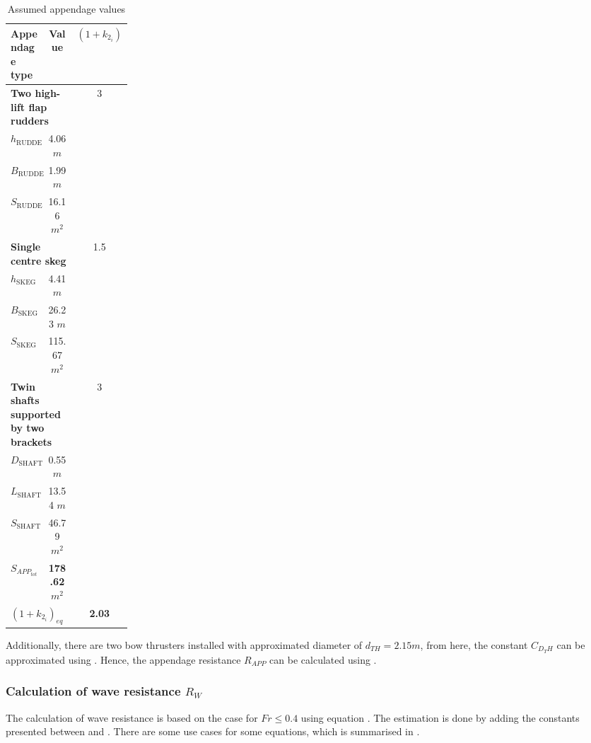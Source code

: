 \begin{table}[h]
    \footnotesize
    \centering
    {\begin{tabular}{ p{0.2\linewidth} c c}
    \hline
    Appendage type & Value & $(1+k_{2_i})$ \\
    \hline
    \multicolumn{2}{l}{\textbf{Two high-lift flap rudders}} & 3\\
    \hline
    $h_{\text{RUDDER}}$ & 4.06 $m$\\
    $B_{\text{RUDDER}}$ & 1.99 $m$\\
    $S_{\text{RUDDER}}$ & 16.16 $m^2$\\
    \hline
    \multicolumn{2}{l}{\textbf{Single centre skeg}} & 1.5\\
    \hline
    $h_{\text{SKEG}}$ & 4.41 $m$\\
    $B_{\text{SKEG}}$ & 26.23 $m$\\
    $S_{\text{SKEG}}$ & 115.67 $m^2$\\
    \hline
    \multicolumn{2}{l}{\textbf{Twin shafts supported by two brackets}} & 3\\
    \hline
    $D_{\text{SHAFT}}$ & 0.55 $m$\\
    $L_{\text{SHAFT}}$ & 13.54 $m$\\
    $S_{\text{SHAFT}}$ & 46.79 $m^2$\\
    \hline
    \multicolumn{1}{l}{\textbf{$S_{APP_{tot}}$}} & \textbf{178.62} $m^2$ \\
    \multicolumn{2}{l}{\textbf{$(1+k_{2_i})_{eq}$}} & \textbf{2.03} \\
    \end{tabular}}
\caption{Assumed appendage values}\label{tbl:assume_appendage_dimension}
\end{table}

Additionally, there are two bow thrusters installed with approximated diameter of $d_{TH}= 2.15 m$, from here, the constant $C_{D_TH}$ can be approximated using . Hence, the appendage resistance $R_{APP}$ can be calculated using .

\subsubsection*{Calculation of wave resistance $R_{W}$}

The calculation of wave resistance is based on the case for $Fr \leq 0.4$ using equation . The estimation is done by adding the constants presented between  and . There are some use cases for some equations, which is summarised in .

